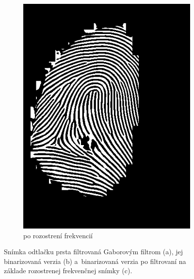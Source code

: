 \begin{figure}[h]
\begin{subfigure}[b]{0.3\linewidth}
      \includegraphics[width=\linewidth]{obrazky-figures/gabor_filtered_binarized_freq_blur.png}
      \caption{po rozostrení frekvencií}
      \label{obr:gabor_binar_freq_blur}
    \end{subfigure}
    \caption{Snímka odtlačku prsta filtrovaná Gaborovým filtrom (a), jej binarizovaná verzia (b) a~binarizovaná verzia po filtrovaní na základe rozostrenej
            frekvenčnej snímky (c).}
    \label{obr:gabor}
  \end{figure}

